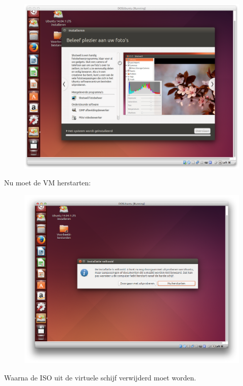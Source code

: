 \documentclass[11pt, a4paper]{article}
\begin{document}
\begin{figure}[H]
	\centering
	\includegraphics[width=\textwidth]{./IMG/S}
\end{figure}

Nu moet de VM herstarten:

\begin{figure}[H]
	\centering
	\includegraphics[width=\textwidth]{./IMG/T}
\end{figure}

Waarna de ISO uit de virtuele schijf verwijderd moet worden. 
\end{document}
